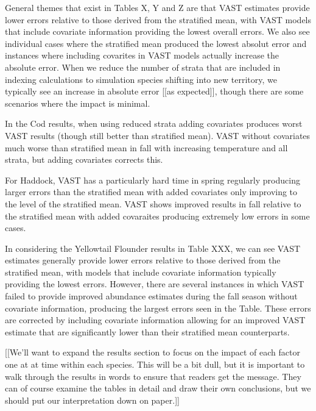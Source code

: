 \documentclass[
  12pt,
]{article}
\begin{document}
General themes that exist in Tables X, Y and Z are that VAST estimates provide lower errors relative to those derived from the stratified mean, with VAST models that include covariate information providing the lowest overall errors. We also see individual cases where the stratified mean produced the lowest absolut error and instances where including covarites in VAST models actually increase the absolute error. When we reduce the number of strata that are included in indexing calculations to simulation species shifting into new territory, we typically see an increase in absolute error {[}{[}as expected{]}{]}, though there are some scenarios where the impact is minimal.

In the Cod results, when using reduced strata adding covariates produces worst VAST results (though still better than stratified mean). VAST without covariates much worse than stratified mean in fall with increasing temperature and all strata, but adding covariates corrects this.

For Haddock, VAST has a particularly hard time in spring regularly producing larger errors than the stratified mean with added covariates only improving to the level of the stratified mean. VAST shows improved results in fall relative to the stratified mean with added covaraites producing extremely low errors in some cases.

In considering the Yellowtail Flounder results in Table XXX, we can see VAST estimates generally provide lower errors relative to those derived from the stratified mean, with models that include covariate information typically providing the lowest errors. However, there are several instances in which VAST failed to provide improved abundance estimates during the fall season without covariate information, producing the largest errors seen in the Table. These errors are corrected by including covariate information allowing for an improved VAST estimate that are significantly lower than their stratified mean counterparts.

{[}{[}We'll want to expand the results section to focus on the impact of each factor one at at time within each species. This will be a bit dull, but it is important to walk through the results in words to ensure that readers get the message. They can of course examine the tables in detail and draw their own conclusions, but we should put our interpretation down on paper.{]}{]}
\end{document}

